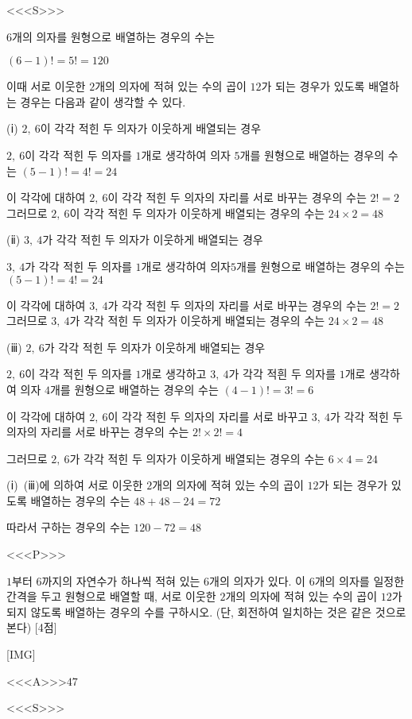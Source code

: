 \documentclass{oblivoir}
\begin{document}
<<<S>>>

$6$개의 의자를 원형으로 배열하는 경우의 수는

$(6-1)! =5! = 120$

이때 서로 이웃한 $2$개의 의자에 적혀 있는 수의 곱이 $12$가 되는 경우가 있도록 배열하는 경우는 다음과 같이 생각할 수 있다.

(ⅰ) $2,\: 6$이 각각 적힌 두 의자가 이웃하게 배열되는 경우

$2,\: 6$이 각각 적힌 두 의자를 $1$개로 생각하여 의자 $5$개를 원형으로 배열하는 경우의 수는 $(5-1)! =4! =24$

이 각각에 대하여 $2,\: 6$이 각각 적힌 두 의자의 자리를 서로 바꾸는 경우의 수는 $2! =2$ 
그러므로 $2,\: 6$이 각각 적힌 두 의자가 이웃하게 배열되는 경우의 수는 $24\times 2=48$

(ⅱ) $3,\: 4$가 각각 적힌 두 의자가 이웃하게 배열되는 경우

$3,\: 4$가 각각 적힌 두 의자를 $1$개로 생각하여 의자$5$개를 원형으로 배열하는 경우의 수는 $(5-1)! =4! =24$

이 각각에 대하여 $3,\: 4$가 각각 적힌 두 의자의 자리를 서로 바꾸는 경우의 수는 $2! =2$ 
그러므로 $3,\: 4$가 각각 적힌 두 의자가 이웃하게 배열되는 경우의 수는 $24\times 2=48$

(ⅲ) $2,\: 6$가 각각 적힌 두 의자가 이웃하게 배열되는 경우

$2,\: 6$이 각각 적힌 두 의자를 $1$개로 생각하고 $3,\: 4$가 각각 적흰 두 의자를 $1$개로 생각하여 의자 $4$개를 원형으로 배열하는 경우의 수는 $(4-1)! =3! =6$

이 각각에 대하여 $2,\: 6$이 각각 적힌 두 의자의 자리를 서로 바꾸고 $3,\: 4$가 각각 적힌 두 의자의 자리를 서로 바꾸는 경우의 수는 $2!\times 2! =4$

그러므로 $2,\: 6$가 각각 적힌 두 의자가 이웃하게 배열되는 경우의 수는 $6\times 4=24$

(ⅰ)~(ⅲ)에 의하여 서로 이웃한 $2$개의 의자에 적혀 있는 수의 곱이 $12$가 되는 경우가 있도록 배열하는 경우의 수는 $48+48-24=72$

따라서 구하는 경우의 수는 $120-72=48$

<<<P>>>

$1$부터 $6$까지의 자연수가 하나씩 적혀 있는 $6$개의 의자가 있다. 이 $6$개의 의자를 일정한 간격을 두고 원형으로 배열할 때, 서로 이웃한 $2$개의 의자에 적혀 있는 수의 곱이 $12$가 되지 않도록 배열하는 경우의 수를 구하시오. (단, 회전하여 일치하는 것은 같은 것으로 본다) [4점]

[IMG]

<<<A>>>$47$

<<<S>>>
\end{document}
